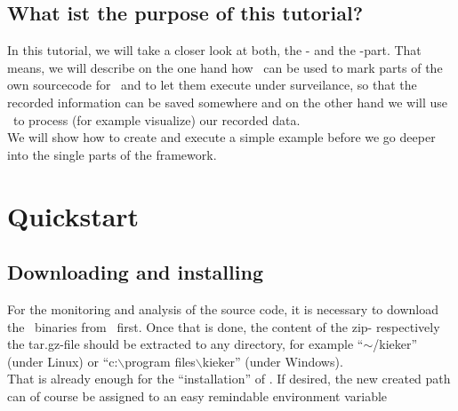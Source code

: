 \documentclass[a4paper, oneside, 11pt]{scrartcl}
\begin{document}
    \subsection{What ist the purpose of this tutorial?}
      In this tutorial, we will take a closer look at both, the \textbf{\KiekerMonitoring}- and the \textbf{\KiekerAnalysis}-part. That means, we will describe on the one hand how \KiekerMonitoring\ can be used to mark parts of the own sourcecode for \Kieker\ and to let them execute under surveilance, so that the recorded information can be saved somewhere and on the other hand we will use \KiekerAnalysis\ to process (for example visualize) our recorded data.\\
      We will show how to create and execute a simple example before we go deeper into the single parts of the framework.

  \section{Quickstart}
    \subsection{Downloading and installing \Kieker}
      For the monitoring and analysis of the source code, it is necessary to download the \Kieker\ binaries from \KiekerDownloadUrl\ first. Once that is done, the content of the zip- respectively the tar.gz-file should be extracted to any directory, for example ``$\sim$/kieker'' (under Linux) or ``c:$\backslash$program files$\backslash$kieker'' (under Windows).\\
      That is already enough for the ``installation'' of \Kieker. If desired, the new created path can of course be assigned to an easy remindable environment variable 
\end{document}
